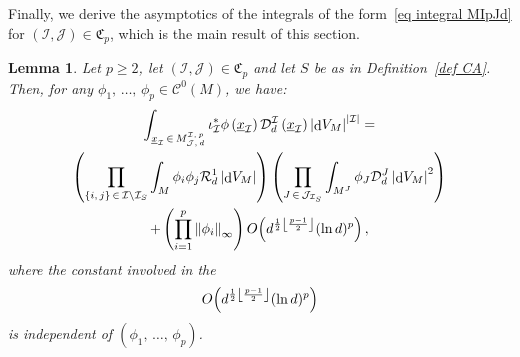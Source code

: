 \documentclass[10pt]{amsart}
\newtheorem{lemm}[theo]{Lemma}\newtheorem{prop}[theo]{Proposition}\newtheorem{coro}[theo]{Corollary}\newtheorem{conj}[theo]{Conjecture}
\theoremstyle{definition}\newtheorem{defi}[theo]{Definition}\newtheorem{rema}[theo]{Remark}\newtheorem{exam}[theo]{Example}\newtheorem{exem}[theo]{Example}\newtheorem{nota}[theo]{Notation}
\DeclareMathOperator{\dmesure}{d}
\DeclarePairedDelimiter{\floor}{\lfloor}{\rfloor}
\newcommand{\D}{\mathcal{D}}
\newcommand{\I}{\mathcal{I}}
\newcommand{\J}{\mathcal{J}}
\newcommand{\clC}{\mathcal{C}}
\newcommand{\clR}{\mathcal{R}}
\newcommand{\frkC}{\mathfrak{C}}
\newcommand{\norm}[1]{\left\lvert #1 \right\rvert}
\newcommand{\Norm}[1]{\left\lVert #1 \right\rVert}
\newcommand{\rmes}[1]{\norm{\dmesure\! V_{#1}}}
\renewcommand{\geq}{\geqslant}
\begin{document}
Finally, we derive the asymptotics of the integrals of the form~\eqref{eq integral MIpJd} for $(\I,\J) \in \frkC_p$, which is the main result of this section.

\begin{lemm}\label{lem leading term}
Let $p \geq 2$, let $(\I,\J) \in \frkC_p$ and let $S$ be as in Definition~\ref{def CA}. Then, for any $\phi_1,\,\dots,\,\phi_p \in \clC^0(M)$, we have:
\begin{multline*}
\int_{\underline{x}_\I\,\in\,M^{\I,\,p}_{\J,\,d}}\iota_\I^*\phi\left(\underline{x}_\I\right) \D^\I_d\left(\underline{x}_\I\right) \rmes{M}^{\norm{\I}}= \\
\left(\prod_{\{i,\,j\}\,\in\,\I \setminus \I_S} \int_M \phi_i\phi_j\clR^1_d \rmes{M}\right)\left(\prod_{J\,\in\,\J_{\I_S}} \int_{M^J} \phi_J \D_d^J \rmes{M}^2 \right)\\
+ \left(\prod_{i=1}^p \Norm{\phi_i}_\infty\right) O\!\left(d^{\frac{1}{2}\floor*{\frac{p-1}{2}}}(\ln d)^p\right),
\end{multline*}
where the constant involved in the
\[
O\!\left(d^{\frac{1}{2}\floor*{\frac{p-1}{2}}}(\ln d)^p\right)\]
is independent of $(\phi_1,\,\dots,\,\phi_p)$.
\end{lemm}
\end{document}
